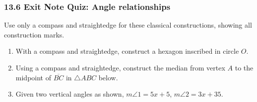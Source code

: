 \documentclass[12pt, twoside]{article}
\begin{document}
\subsubsection*{13.6 Exit Note Quiz: Angle relationships}
Use only a compass and straightedge for these classical constructions, showing all construction marks.
 \begin{enumerate}

 \item With a compass and straightedge, construct a hexagon inscribed in circle $O$.
   \vspace{0.5cm}
   \begin{center}
   \end{center}
      \vspace{1cm}

   \item Using  a  compass  and  straightedge,  construct the median from vertex $A$ to the midpoint of $\overline{BC}$ in $\triangle ABC$ below.
     \vspace{0.5cm}
   \begin{center}
   \end{center}

 \newpage

 \item Given two vertical angles as shown, $m \angle 1 = 5x+5$, $m \angle 2 = 3x+35$. \vspace{1cm}
   \begin{flushright}
   \end{flushright}
 \vspace{3cm}



\end{enumerate}
\end{document}
